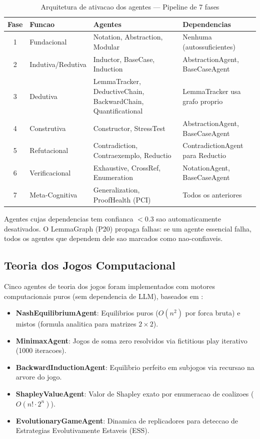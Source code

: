 \documentclass[5p]{elsarticle}
\begin{document}
\begin{table}[H]
  \centering
  \caption{Arquitetura de ativacao dos agentes — Pipeline de 7 fases}
  \label{tab:pipeline}
  \small
  \begin{tabular}{clp{4.5cm}p{4cm}}
    \toprule
    \textbf{Fase} & \textbf{Funcao} & \textbf{Agentes} & \textbf{Dependencias} \\
    \midrule
    1 & Fundacional & Notation, Abstraction, Modular & Nenhuma (autossuficientes) \\
    \rowcolor{bluebg}
    2 & Indutiva/Redutiva & Inductor, BaseCase, Induction & AbstractionAgent, BaseCaseAgent \\
    3 & Dedutiva & LemmaTracker, DeductiveChain, BackwardChain, Quantificational & LemmaTracker usa grafo proprio \\
    \rowcolor{yellowbg}
    4 & Construtiva & Constructor, StressTest & AbstractionAgent, BaseCaseAgent \\
    5 & Refutacional & Contradiction, Contraexemplo, Reductio & ContradictionAgent para Reductio \\
    \rowcolor{greenbg}
    6 & Verificacional & Exhaustive, CrossRef, Enumeration & NotationAgent, BaseCaseAgent \\
    7 & Meta-Cognitiva & Generalization, ProofHealth (PCI) & Todos os anteriores \\
    \bottomrule
  \end{tabular}
\end{table}

Agentes cujas dependencias tem confianca $<0.3$ sao automaticamente desativados.
O LemmaGraph (P20) propaga falhas: se um agente essencial falha, todos os
agentes que dependem dele sao marcados como nao-confiaveis.

\subsection{Teoria dos Jogos Computacional}

Cinco agentes de teoria dos jogos foram implementados com motores computacionais
puros (sem dependencia de LLM), baseados em \cite{nash1950,vonneumann1944,shapley1953,smith1973}:

\begin{itemize}
  \item \textbf{NashEquilibriumAgent}: Equilibrios puros ($O(n^2)$ por forca bruta)
    e mistos (formula analitica para matrizes $2\times 2$).
  \item \textbf{MinimaxAgent}: Jogos de soma zero resolvidos via fictitious play
    iterativo (1000 iteracoes).
  \item \textbf{BackwardInductionAgent}: Equilibrio perfeito em subjogos via
    recursao na arvore do jogo.
  \item \textbf{ShapleyValueAgent}: Valor de Shapley exato por enumeracao de
    coalizoes ($O(n!\cdot 2^n)$).
  \item \textbf{EvolutionaryGameAgent}: Dinamica de replicadores para deteccao
    de Estrategias Evolutivamente Estaveis (ESS).
\end{itemize}
\end{document}
